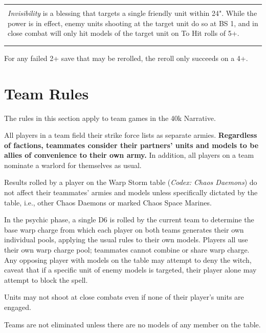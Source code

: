 \documentclass{novanarrative}
\begin{document}
\begin{center}  
\begin{tabular}{L{6in}}
\hline\\
  \emph{Invisibility} is a blessing that targets a single friendly unit
  within 24". While the power is in effect, enemy units shooting at the
  target unit do so at BS 1, and in close combat will only hit models of
  the target unit on To Hit rolls of 5+.\\
\\
\hline\\
\end{tabular}
\end{center}

For any failed 2+ save that may be rerolled, the reroll only succeeds on a 4+.

\section{Team Rules}

The rules in this section apply to team games in the 40k Narrative.

All players in a team field their strike force lists as separate
armies. \textbf{Regardless of factions, teammates consider their
  partners' units and models to be allies of convenience to their own
  army.}  In addition, all players on a team nominate a warlord for
themselves as usual.

Results rolled by a player on the Warp Storm table (\emph{Codex: Chaos
  Daemons}) do not affect their teammates' armies and models unless
specifically dictated by the table, i.e., other Chaos Daemons or
marked Chaos Space Marines.

In the psychic phase, a single D6 is rolled by the current team to
determine the base warp charge from which each player on both teams
generates their own individual pools, applying the usual rules to
their own models. Players all use their own warp charge pool;
teammates cannot combine or share warp charge. Any opposing player
with models on the table may attempt to deny the witch, caveat that if
a specific unit of enemy models is targeted, their player alone may
attempt to block the spell.

Units may not shoot at close combats even if none of their player's
units are engaged.

Teams are not eliminated unless there are no models of any member on
the table.
\end{document}
